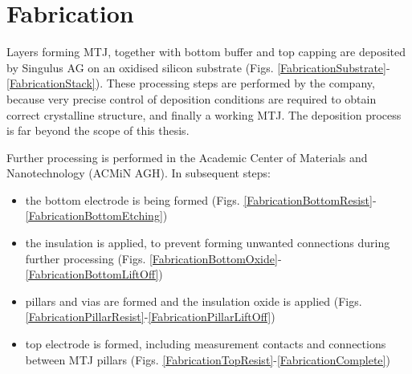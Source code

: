 \section{Fabrication} \label{sec:FabricationFabrication}

    Layers forming MTJ, together with bottom buffer and top capping are deposited by Singulus AG on an oxidised silicon substrate (Figs. \ref{FabricationSubstrate}-\ref{FabricationStack}). These processing steps are performed by the company, because very precise control of deposition conditions are required to obtain correct crystalline structure, and finally a working MTJ. The deposition process is far beyond the scope of this thesis.
    
    Further processing is performed in the Academic Center of Materials and Nanotechnology (ACMiN AGH). In subsequent steps:
    \begin{itemize}[noitemsep,label=\textbullet]
    	\item the bottom electrode is being formed (Figs. \ref{FabricationBottomResist}-\ref{FabricationBottomEtching})
    	\item the insulation is applied, to prevent forming unwanted connections during further processing (Figs. \ref{FabricationBottomOxide}-\ref{FabricationBottomLiftOff})
    	\item pillars and vias are formed and the insulation oxide is applied (Figs. \ref{FabricationPillarResist}-\ref{FabricationPillarLiftOff})
    	\item top electrode is formed, including measurement contacts and connections between MTJ pillars (Figs. \ref{FabricationTopResist}-\ref{FabricationComplete})
    \end{itemize}
    
